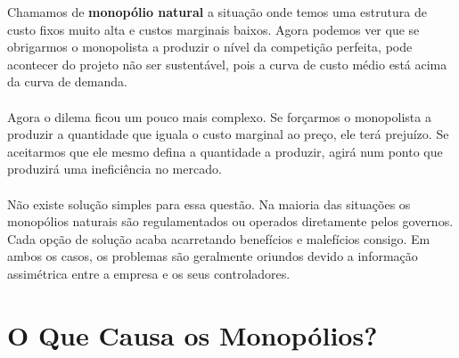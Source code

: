 \documentclass[a4paper,11pt,oneside]{book}
\theoremstyle{definition}
\theoremstyle{break}
\begin{document}
Chamamos de \textbf{monopólio natural} a situação onde temos uma estrutura de custo fixos muito alta e custos marginais baixos. Agora podemos ver que se obrigarmos o monopolista a produzir o nível da competição perfeita, pode acontecer do projeto não ser sustentável, pois a curva de custo médio está acima da curva de demanda.
\\~\\
Agora o dilema ficou um pouco mais complexo. Se forçarmos o monopolista a produzir a quantidade que iguala o custo marginal ao preço, ele terá prejuízo. Se aceitarmos que ele mesmo defina a quantidade a produzir, agirá num ponto que produzirá uma ineficiência no mercado.
\\~\\
Não existe solução simples para essa questão. Na maioria das situações os monopólios naturais são regulamentados ou operados diretamente pelos governos. Cada opção de solução acaba acarretando benefícios e malefícios consigo. Em ambos os casos, os problemas são geralmente oriundos devido a informação assimétrica entre a empresa e os seus controladores.

\section{O Que Causa os Monopólios?}
\end{document}
